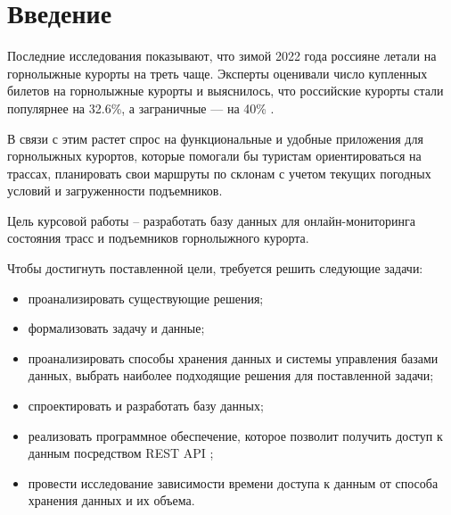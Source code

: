 \chapter*{Введение}

Последние исследования показывают, что зимой 2022 года россияне летали на горнолыжные курорты на треть чаще. Эксперты оценивали число купленных билетов на горнолыжные курорты и выяснилось, что российские курорты стали популярнее на 32.6\%, а заграничные — на 40\% \cite{stat}.

В связи с этим растет спрос на функциональные и удобные приложения для горнолыжных курортов, которые помогали бы туристам ориентироваться на трассах, планировать свои маршруты по склонам с учетом текущих погодных условий и загруженности подъемников.

Цель курсовой работы -- разработать базу данных для онлайн-мониторинга состояния трасс и подъемников горнолыжного курорта. 



Чтобы достигнуть поставленной цели, требуется решить следующие задачи:

\begin{itemize}
	\item проанализировать существующие решения;
	\item формализовать задачу и данные;
	\item проанализировать способы хранения данных и системы управления базами данных, выбрать наиболее подходящие решения для поставленной задачи;
	\item спроектировать и разработать базу данных;
    \item  реализовать программное обеспечение, которое позволит получить доступ к данным посредством REST API \cite{api};
    \item провести исследование зависимости времени доступа к данным от способа хранения данных и их объема.
\end{itemize}

